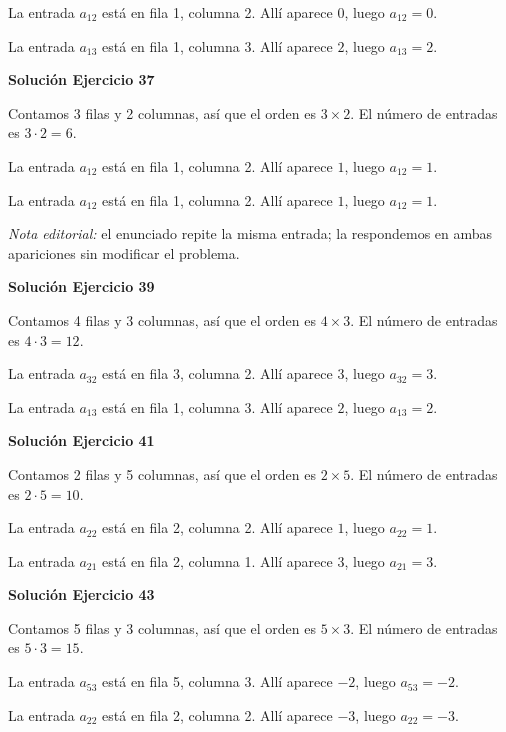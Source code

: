 La entrada $a_{12}$ está en fila 1, columna 2. Allí aparece $0$, luego $\boxed{a_{12}=0}$.

La entrada $a_{13}$ está en fila 1, columna 3. Allí aparece $2$, luego $\boxed{a_{13}=2}$.


\par\bigskip\noindent\textbf{Solución Ejercicio 37}\par\nobreak
Contamos 3 filas y 2 columnas, así que el orden es $3\times2$. El número de entradas es $3\cdot 2=6$.

La entrada $a_{12}$ está en fila 1, columna 2. Allí aparece $1$, luego $\boxed{a_{12}=1}$.

La entrada $a_{12}$ está en fila 1, columna 2. Allí aparece $1$, luego $\boxed{a_{12}=1}$.

\emph{Nota editorial:} el enunciado repite la misma entrada; la respondemos en ambas apariciones sin modificar el problema.


\par\bigskip\noindent\textbf{Solución Ejercicio 39}\par\nobreak
Contamos 4 filas y 3 columnas, así que el orden es $4\times3$. El número de entradas es $4\cdot 3=12$.

La entrada $a_{32}$ está en fila 3, columna 2. Allí aparece $3$, luego $\boxed{a_{32}=3}$.

La entrada $a_{13}$ está en fila 1, columna 3. Allí aparece $2$, luego $\boxed{a_{13}=2}$.


\par\bigskip\noindent\textbf{Solución Ejercicio 41}\par\nobreak
Contamos 2 filas y 5 columnas, así que el orden es $2\times5$. El número de entradas es $2\cdot 5=10$.

La entrada $a_{22}$ está en fila 2, columna 2. Allí aparece $1$, luego $\boxed{a_{22}=1}$.

La entrada $a_{21}$ está en fila 2, columna 1. Allí aparece $3$, luego $\boxed{a_{21}=3}$.


\par\bigskip\noindent\textbf{Solución Ejercicio 43}\par\nobreak
Contamos 5 filas y 3 columnas, así que el orden es $5\times3$. El número de entradas es $5\cdot 3=15$.

La entrada $a_{53}$ está en fila 5, columna 3. Allí aparece $-2$, luego $\boxed{a_{53}=-2}$.

La entrada $a_{22}$ está en fila 2, columna 2. Allí aparece $-3$, luego $\boxed{a_{22}=-3}$.


